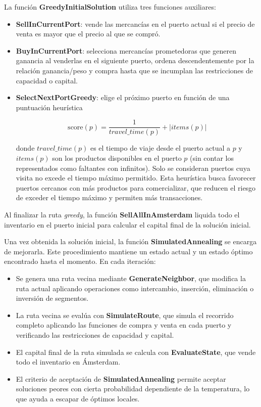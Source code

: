 \documentclass[12pt, a4paper]{article}
\begin{document}
La función \textbf{GreedyInitialSolution} utiliza tres funciones auxiliares: 
\begin{itemize}
    \item \textbf{SellInCurrentPort}: vende las mercancías en el puerto actual si el precio de venta es mayor que el precio al que se compró.
    \item \textbf{BuyInCurrentPort}: selecciona mercancías prometedoras que generen ganancia al venderlas en el siguiente puerto, ordena descendentemente por la relación ganancia/peso y compra hasta que se incumplan las restricciones de capacidad o capital.
    \item \textbf{SelectNextPortGreedy}: elige el próximo puerto en función de una puntuación heurística


    \[
    \text{score}(p) = \frac{1}{travel\_time(p)} + \left|items(p)\right|
    \]


    donde $travel\_time(p)$ es el tiempo de viaje desde el puerto actual a $p$ y $items(p)$ son los productos disponibles en el puerto $p$ (sin contar los representados como faltantes con infinitos).
    Solo se consideran puertos cuya visita no excede el tiempo máximo permitido. Esta heurística busca favorecer puertos cercanos con más productos para comercializar, que reducen el riesgo de exceder el tiempo máximo y permiten más transacciones.
\end{itemize}

Al finalizar la ruta \textit{greedy}, la función \textbf{SellAllInAmsterdam} liquida todo el inventario en el puerto inicial para calcular el capital final de la solución inicial.

Una vez obtenida la solución inicial, la función \textbf{SimulatedAnnealing} se encarga de mejorarla. Este procedimiento mantiene un estado actual y un estado óptimo encontrado hasta el momento. En cada iteración:
\begin{itemize}
    \item Se genera una ruta vecina mediante \textbf{GenerateNeighbor}, que modifica la ruta actual aplicando operaciones como intercambio, inserción, eliminación o inversión de segmentos.
    \item La ruta vecina se evalúa con \textbf{SimulateRoute}, que simula el recorrido completo aplicando las funciones de compra y venta en cada puerto y verificando las restricciones de capacidad y capital.
    \item El capital final de la ruta simulada se calcula con \textbf{EvaluateState}, que vende todo el inventario en Ámsterdam.
    \item El criterio de aceptación de \textbf{SimulatedAnnealing} permite aceptar soluciones peores con cierta probabilidad dependiente de la temperatura, lo que ayuda a escapar de óptimos locales.
\end{itemize}
\end{document}
